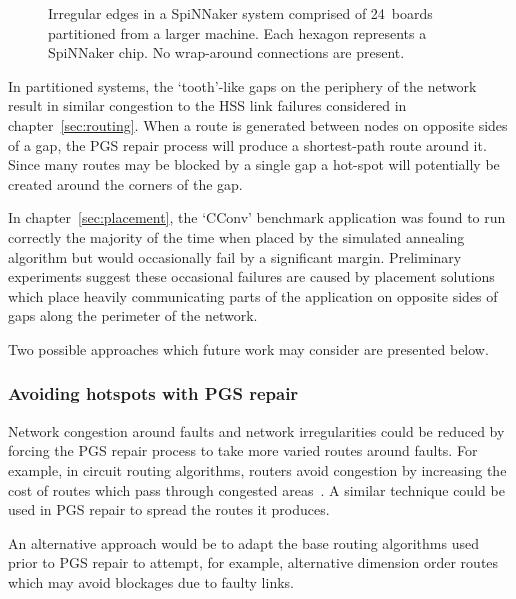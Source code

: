 			\begin{figure}
				\center
				
				\caption[Irregular edges of a partitioned SpiNNaker system.]%
				{Irregular edges in a SpiNNaker system comprised of 24~boards
				partitioned from a larger machine.  Each hexagon represents a SpiNNaker
				chip. No wrap-around connections are present.}
				\label{fig:spalloc-mesh}
			\end{figure}
			
			In partitioned systems, the `tooth'-like gaps on the periphery of the
			network result in similar congestion to the HSS link failures considered
			in chapter~\ref{sec:routing}. When a route is generated between nodes on
			opposite sides of a gap, the PGS repair process will produce a
			shortest-path route around it. Since many routes may be blocked by a
			single gap a hot-spot will potentially be created around the corners of
			the gap.
			
			In chapter~\ref{sec:placement}, the `CConv' benchmark application was
			found to run correctly the majority of the time when placed by the
			simulated annealing algorithm but would occasionally fail by a
			significant margin. Preliminary experiments suggest these occasional
			failures are caused by placement solutions which place heavily
			communicating parts of the application on opposite sides of gaps along the
			perimeter of the network.
			
			Two possible approaches which future work may consider are presented
			below.
			
			\subsubsection{Avoiding hotspots with PGS repair}
				
				\label{sec:pgs-repair-improvements}	
				
				Network congestion around faults and network irregularities could be
				reduced by forcing the PGS repair process to take more varied routes
				around faults. For example, in circuit routing algorithms, routers
				avoid congestion by increasing the cost of routes which pass through
				congested areas~\cite{kahng11}. A similar technique could be used in
				PGS repair to spread the routes it produces.
				
				An alternative approach would be to adapt the base routing algorithms
				used prior to PGS repair to attempt, for example, alternative dimension
				order routes which may avoid blockages due to faulty links.
			
